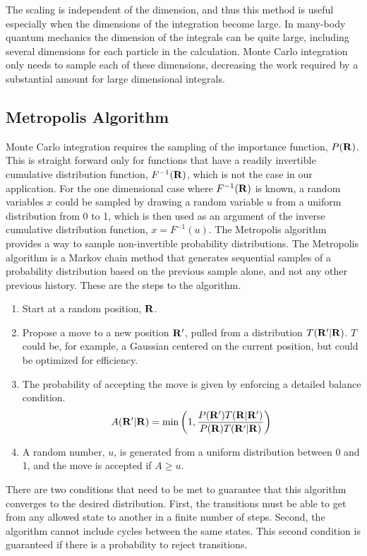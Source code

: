 The scaling is independent of the dimension, and thus this method is useful especially when the dimensions of the integration become large. In many-body quantum mechanics the dimension of the integrals can be quite large, including several dimensions for each particle in the calculation. Monte Carlo integration only needs to sample each of these dimensions, decreasing the work required by a substantial amount for large dimensional integrals.

\subsection{Metropolis Algorithm}
Monte Carlo integration requires the sampling of the importance function, $P(\mathbf{R})$. This is straight forward only for functions that have a readily invertible cumulative distribution function, $F^{-1}(\mathbf{R})$, which is not the case in our application. For the one dimensional case where $F^{-1}(\mathbf{R})$ is known, a random variables $x$ could be sampled by drawing a random variable $u$ from a uniform distribution from 0 to 1, which is then used as an argument of the inverse cumulative distribution function, $x=F^{-1}(u)$. The Metropolis algorithm provides a way to sample non-invertible probability distributions. The Metropolis algorithm is a Markov chain method that generates sequential samples of a probability distribution based on the previous sample alone, and not any other previous history. These are the steps to the algorithm.
\begin{enumerate}
   \item Start at a random position, $\mathbf{R}$.
   \item Propose a move to a new position $\mathbf{R}'$, pulled from a distribution $T(\mathbf{R}'|\mathbf{R})$. $T$ could be, for example, a Gaussian centered on the current position, but could be optimized for efficiency.
   \item The probability of accepting the move is given by enforcing a detailed balance condition.
   \begin{equation}
      A(\mathbf{R}'|\mathbf{R}) = \mathrm{min}\left(1, \frac{P(\mathbf{R}')T(\mathbf{R}|\mathbf{R}')}{P(\mathbf{R})T(\mathbf{R}'|\mathbf{R})}\right)
   \end{equation}
   \item A random number, $u$, is generated from a uniform distribution between 0 and 1, and the move is accepted if $A\ge u$.
\end{enumerate}

There are two conditions that need to be met to guarantee that this algorithm converges to the desired distribution. First, the transitions must be able to get from any allowed state to another in a finite number of steps. Second, the algorithm cannot include cycles between the same states. This second condition is guaranteed if there is a probability to reject transitions.

